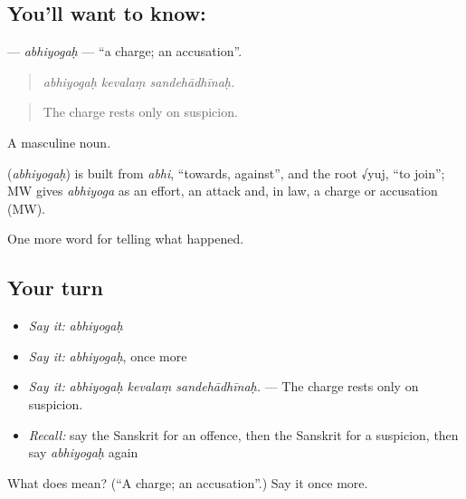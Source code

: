 \subsection*{You'll want to know: }
\textbf{} — \emph{abhiyogaḥ} — \textquotedblleft{}a charge; an accusation\textquotedblright{}.

\begin{quote}
  
\end{quote}

\begin{quote}
\emph{abhiyogaḥ kevalaṃ sandehādhīnaḥ.}
\end{quote}

\begin{quote}
The charge rests only on suspicion.
\end{quote}

A masculine noun.

\begin{cousinweb}
\textbf{} (\emph{abhiyogaḥ}) is built from \emph{abhi}, \textquotedblleft{}towards, against\textquotedblright{}, and the root √yuj, \textquotedblleft{}to join\textquotedblright{}; MW gives \emph{abhiyoga} as an effort, an attack and, in law, a charge or accusation (MW).
\end{cousinweb}

\begin{grammarlens}[title={What you've built}]
One more word for telling what happened.
\end{grammarlens}

\subsection*{Your turn}
\begin{itemize}
\raggedright
  \item \emph{Say it:} \emph{abhiyogaḥ}
  \item \emph{Say it:} \emph{abhiyogaḥ}, once more
  \item \emph{Say it:} \emph{abhiyogaḥ kevalaṃ sandehādhīnaḥ.} — The charge rests only on suspicion.
  \item \emph{Recall:} say the Sanskrit for an offence, then the Sanskrit for a suspicion, then say \emph{abhiyogaḥ} again
\end{itemize}

\begin{tcolorbox}[breakable,colback=teal!4,colframe=teal!35!black,title={Before you move on}]
What does  mean? (\textquotedblleft{}A charge; an accusation\textquotedblright{}.) Say it once more.
\end{tcolorbox}
